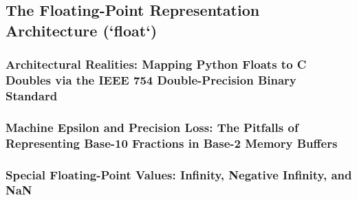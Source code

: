\subsection{The Floating-Point Representation Architecture (`float`)}
\subsubsection{Architectural Realities: Mapping Python Floats to C Doubles via the IEEE 754 Double-Precision Binary Standard}
\subsubsection{Machine Epsilon and Precision Loss: The Pitfalls of Representing Base-10 Fractions in Base-2 Memory Buffers}
\subsubsection{Special Floating-Point Values: Infinity, Negative Infinity, and NaN}
